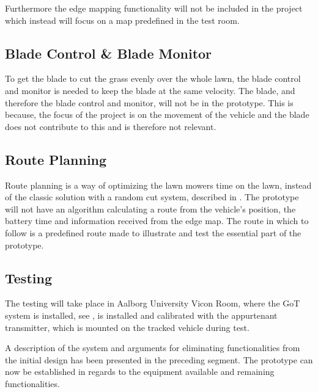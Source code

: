 Furthermore the edge mapping functionality will not be included in the project which instead will focus on a map predefined in the test room.


\subsection{Blade Control \& Blade Monitor}
To get the blade to cut the grass evenly over the whole lawn, the blade control and monitor is needed to keep the blade at the same velocity.
The blade, and therefore the blade control and monitor, will not be in the prototype. This is because, the focus of the project is on the movement of the vehicle and the blade does not contribute to this and is therefore not relevant.

\subsection{Route Planning}
Route planning is a way of optimizing the lawn mowers time on the lawn, instead of the classic solution with a random cut system, described in . The prototype will not have an algorithm calculating a route from the vehicle's position, the battery time and information received from the edge map. The route in which to follow is a predefined route made to illustrate and test the essential part of the prototype.

\subsection{Testing}
The testing will take place in Aalborg University Vicon Room, where the GoT system is installed, see , is installed and calibrated with the appurtenant transmitter, which is mounted on the tracked vehicle during test.

A description of the system and arguments for eliminating functionalities from the initial design has been presented in the preceding segment. The prototype can now be established in regards to the equipment available and remaining functionalities.
